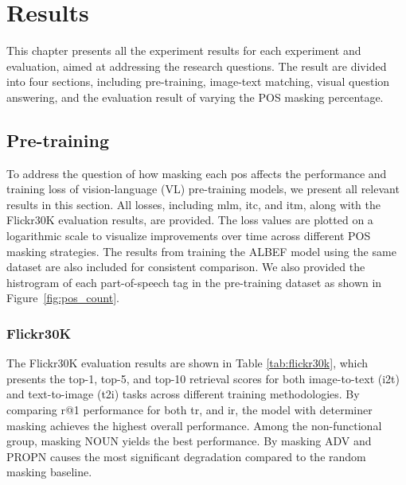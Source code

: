\chapter{Results}
This chapter presents all the experiment results for each experiment and evaluation, aimed at addressing the research questions.
The result are divided into four sections, including pre-training, image-text matching, visual question answering, and the evaluation result of varying the POS masking percentage.

\section{Pre-training}
To address the question of how masking each \acrshort{pos} affects the performance and training loss of vision-language (VL) pre-training models, we present all relevant results in this section.  
All losses, including \acrshort{mlm}, \acrshort{itc}, and \acrshort{itm}, along with the Flickr30K evaluation results, are provided.  
The loss values are plotted on a logarithmic scale to visualize improvements over time across different POS masking strategies.  
The results from training the ALBEF model using the same dataset are also included for consistent comparison.
We also provided the histrogram of each part-of-speech tag in the pre-training dataset as shown in Figure~\ref{fig:pos_count}.

\subsection{Flickr30K}
The Flickr30K evaluation results are shown in Table \ref{tab:flickr30k}, which presents the top-1, top-5, and top-10 retrieval scores for both image-to-text (i2t) and text-to-image (t2i) tasks across different training methodologies.  
By comparing r@1 performance for both \acrshort{tr}, and \acrshort{ir}, the model with determiner masking achieves the highest overall performance.
Among the non-functional group, masking NOUN yields the best performance.
By masking ADV and PROPN causes the most significant degradation compared to the random masking baseline.

